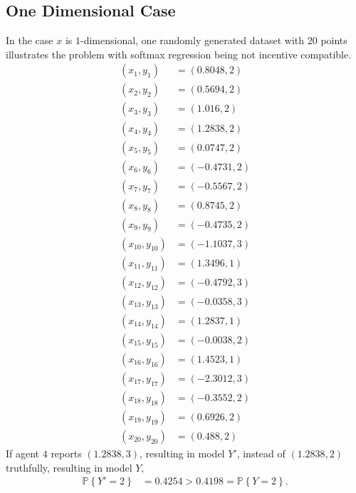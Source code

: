 \documentclass{article}
\begin{document}
\subsection{One Dimensional Case}
In the case $x $ is $1$-dimensional, one randomly generated dataset with $20$ points illustrates the problem with softmax regression being not incentive compatible.
\begin{align*}
\left(x_{1}, y_{1}\right) &= \left(0.8048,2\right)
\\ \left(x_{2}, y_{2}\right) &= \left(0.5694,2\right)
\\ \left(x_{3}, y_{3}\right) &= \left(1.016,2\right)
\\ \left(x_{4}, y_{4}\right) &= \left(1.2838,2\right)
\\ \left(x_{5}, y_{5}\right) &= \left(0.0747,2\right)
\\ \left(x_{6}, y_{6}\right) &= \left(-0.4731,2\right)
\\ \left(x_{7}, y_{7}\right) &= \left(-0.5567,2\right)
\\ \left(x_{8}, y_{8}\right) &= \left(0.8745,2\right)
\\ \left(x_{9}, y_{9}\right) &= \left(-0.4735,2\right)
\\ \left(x_{10}, y_{10}\right) &= \left(-1.1037,3\right)
\\ \left(x_{11}, y_{11}\right) &= \left(1.3496,1\right)
\\ \left(x_{12}, y_{12}\right) &= \left(-0.4792,3\right)
\\ \left(x_{13}, y_{13}\right) &= \left(-0.0358,3\right)
\\ \left(x_{14}, y_{14}\right) &= \left(1.2837,1\right)
\\ \left(x_{15}, y_{15}\right) &= \left(-0.0038,2\right)
\\ \left(x_{16}, y_{16}\right) &= \left(1.4523,1\right)
\\ \left(x_{17}, y_{17}\right) &= \left(-2.3012,3\right)
\\ \left(x_{18}, y_{18}\right) &= \left(-0.3552,2\right)
\\ \left(x_{19}, y_{19}\right) &= \left(0.6926,2\right)
\\ \left(x_{20}, y_{20}\right) &= \left(0.488,2\right)
\end{align*}
If agent $4$ reports $\left(1.2838, 3\right)$, resulting in model $Y'$, instead of $\left(1.2838, 2\right)$ truthfully, resulting in model $Y, $
\begin{align*}
\mathbb{P}\left\{Y' = 2\right\} &= 0.4254 > 0.4198 = \mathbb{P}\left\{Y = 2\right\}.
\end{align*}
\end{document}
